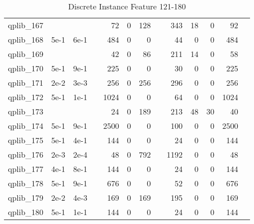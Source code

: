 \begin{table}
\begin{tabular}{lrrrrrrrrrrrr}
qplib\_167	&		&		&	&	72	&	0	&	128	&	&	343	&	18	&	0	&	92	\\
qplib\_168	&	5e-1	&	6e-1	&	&	484	&	0	&	0	&	&	44	&	0	&	0	&	484	\\
qplib\_169	&		&		&	&	42	&	0	&	86	&	&	211	&	14	&	0	&	58	\\
qplib\_170	&	5e-1	&	9e-1	&	&	225	&	0	&	0	&	&	30	&	0	&	0	&	225	\\
qplib\_171	&	2e-2	&	3e-3	&	&	256	&	0	&	256	&	&	296	&	0	&	0	&	256	\\
qplib\_172	&	5e-1	&	1e-1	&	&	1024	&	0	&	0	&	&	64	&	0	&	0	&	1024	\\
qplib\_173	&		&		&	&	24	&	0	&	189	&	&	213	&	48	&	30	&	40	\\
qplib\_174	&	5e-1	&	9e-1	&	&	2500	&	0	&	0	&	&	100	&	0	&	0	&	2500	\\
qplib\_175	&	5e-1	&	4e-1	&	&	144	&	0	&	0	&	&	24	&	0	&	0	&	144	\\
qplib\_176	&	2e-3	&	2e-4	&	&	48	&	0	&	792	&	&	1192	&	0	&	0	&	48	\\
qplib\_177	&	4e-1	&	8e-1	&	&	144	&	0	&	0	&	&	24	&	0	&	0	&	144	\\
qplib\_178	&	5e-1	&	9e-1	&	&	676	&	0	&	0	&	&	52	&	0	&	0	&	676	\\
qplib\_179	&	2e-2	&	4e-3	&	&	169	&	0	&	169	&	&	195	&	0	&	0	&	169	\\
qplib\_180	&	5e-1	&	1e-1	&	&	144	&	0	&	0	&	&	24	&	0	&	0	&	144	\\



\bottomrule

\end{tabular}  
\label{tab:A3}
\caption{Discrete  Instance Feature 121-180} 

\end{table}

